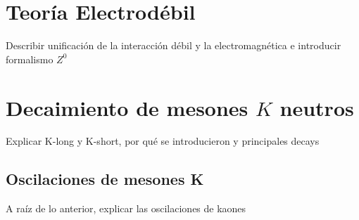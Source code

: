 \section{Teoría Electrodébil}\label{sec:electroweak}
Describir unificación de la interacción débil y la electromagnética
e introducir formalismo $Z^0$
\section{Decaimiento de mesones $K$ neutros}
\label{sec:neutral_kaon_decay}

Explicar K-long y K-short, por qué se introducieron y principales decays

\subsection{Oscilaciones de mesones K}\label{sec:kaon_oscillations}

A raíz de lo anterior, explicar las oscilaciones de kaones